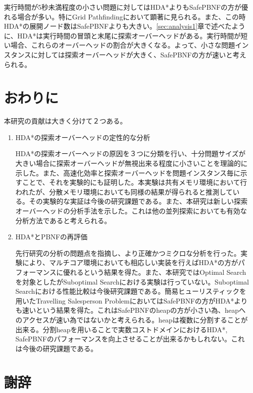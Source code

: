\documentclass{jsarticle}
\begin{document}
実行時間が5秒未満程度の小さい問題に対してはHDA*よりもSafePBNFの方が優れる場合が多い。特にGrid Pathfindingにおいて顕著に見られる。また、この時HDA*の展開ノード数はSafePBNFよりも大きい。\ref{sec:analysis1}章で述べたように、HDA*は実行時間の冒頭と末尾に探索オーバーヘッドがある。実行時間が短い場合、これらのオーバーヘッドの割合が大きくなる。よって、小さな問題インスタンスに対しては探索オーバーヘッドが大きく、SafePBNFの方が速いと考えられる。

\section{おわりに}
\label{sec:conclusion}

本研究の貢献は大きく分けて２つある。

\begin{enumerate}
\item HDA*の探索オーバーヘッドの定性的な分析

HDA*の探索オーバーヘッドの原因を３つに分類を行い、十分問題サイズが大きい場合に探索オーバーヘッドが無視出来る程度に小さいことを理論的に示した。また、高速化効率と探索オーバーヘッドを問題インスタンス毎に示すことで、それを実験的にも証明した。本実験は共有メモリ環境において行われたが、分散メモリ環境においても同様の結果が得られると推測している。その実験的な実証は今後の研究課題である。また、本研究は新しい探索オーバーヘッドの分析手法を示した。これは他の並列探索においても有効な分析方法であると考えられる。
\newline

\item HDA*とPBNFの再評価

先行研究の分析の問題点を指摘し、より正確かつミクロな分析を行った。実験により、マルチコア環境においても相応しい実装を行えばHDA*の方がパフォーマンスに優れるという結果を得た。また、本研究ではOptimal Searchを対象としたがSuboptimal Searchにおける実験は行っていない。Suboptimal Searchにおける性能比較は今後研究課題である。簡易ヒューリスティックを用いたTravelling Salesperson ProblemにおいてはSafePBNFの方がHDA*よりも速いという結果を得た。これはSafePBNFのheapの方が小さい為、heapへのアクセスが速い為ではないかと考えられる。heapは複数に分割することが出来る。分割heapを用いることで実数コストドメインにおけるHDA*, SafePBNFのパフォーマンスを向上させることが出来るかもしれない。これは今後の研究課題である。

\end{enumerate}

\section{謝辞}
\end{document}
